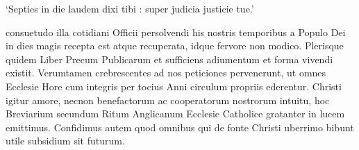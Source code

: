 {}

\begin{center}
	`Septies in die laudem dixi tibi : super judicia justicie tue.'
\end{center}


\begin{otherlanguage}{ecclesiasticallatin}
\par\noindent
{} consuetudo illa cotidiani Officii persolvendi his nostris temporibus a Populo Dei in dies magis recepta est atque recuperata, idque fervore non modico. Plerisque quidem Liber Precum Publicarum et sufficiens adiumentum et forma vivendi existit. Verumtamen crebrescentes ad nos peticiones pervenerunt, ut omnes Ecclesie Hore cum integris per tocius Anni circulum propriis ederentur. Christi igitur amore, necnon benefactorum ac cooperatorum nostrorum intuitu, hoc Breviarium secundum Ritum Anglicanum Ecclesie Catholice gratanter in lucem emittimus. Confidimus autem quod omnibus qui de fonte Christi uberrimo bibunt utile subsidium sit futurum.\\

\end{otherlanguage}



\vspace{1\baselineskip}




